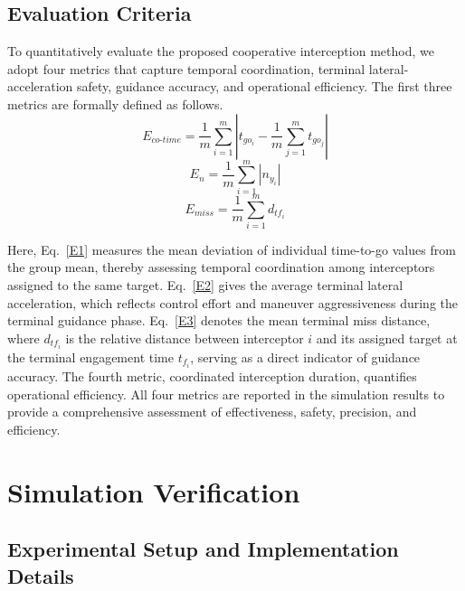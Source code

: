 \documentclass[lettersize,journal]{IEEEtran}
\begin{document}
\subsection{Evaluation Criteria}
\label{subsec:eval}

To quantitatively evaluate the proposed cooperative interception method, we adopt four metrics that capture temporal coordination, terminal lateral-acceleration safety, guidance accuracy, and operational efficiency. The first three metrics are formally defined as follows.
\begin{equation}
\label{E1}
E_{co\text{-}time} = \frac{1}{m}\sum_{i=1}^{m} \left| t_{go_i} - \frac{1}{m}\sum_{j=1}^{m} t_{go_j} \right|
\end{equation}
\begin{equation}
\label{E2}
E_{n} = \frac{1}{m}\sum_{i=1}^{m} |n_{y_i}|
\end{equation}
\begin{equation}
\label{E3}
E_{miss} = \frac{1}{m}\sum_{i=1}^{m} d_{tf_i}
\end{equation}

Here, Eq.~\eqref{E1} measures the mean deviation of individual time-to-go values from the group mean, thereby assessing temporal coordination among interceptors assigned to the same target. Eq.~\eqref{E2} gives the average terminal lateral acceleration, which reflects control effort and maneuver aggressiveness during the terminal guidance phase. Eq.~\eqref{E3} denotes the mean terminal miss distance, where $d_{tf_i}$ is the relative distance between interceptor $i$ and its assigned target at the terminal engagement time $t_{f_i}$, serving as a direct indicator of guidance accuracy. The fourth metric, coordinated interception duration, quantifies operational efficiency. All four metrics are reported in the simulation results to provide a comprehensive assessment of effectiveness, safety, precision, and efficiency.










\section{Simulation Verification}
\label{sec:simulation}

\subsection{Experimental Setup and Implementation Details}
\label{subsec:setup}
\end{document}
